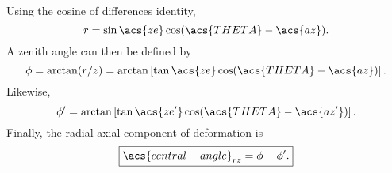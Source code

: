 Using the cosine of differences identity,
\begin{equation}
    r=\sin\acs{ze}\cos(\acs{THETA}-\acs{az}).
\end{equation}
A zenith angle can then be defined by
\begin{equation}
    \phi=\arctan(r/z)=\arctan\left[\tan\acs{ze}\cos(\acs{THETA}-\acs{az})\right].
\end{equation}
Likewise,
\begin{equation}
    \phi'=\arctan\left[\tan\acs{ze'}\cos(\acs{THETA}-\acs{az'})\right].
\end{equation}
Finally, the radial-axial component of deformation is
\begin{equation}
    \boxed{\acs{central-angle}_{rz}=\phi-\phi'.}
\end{equation}